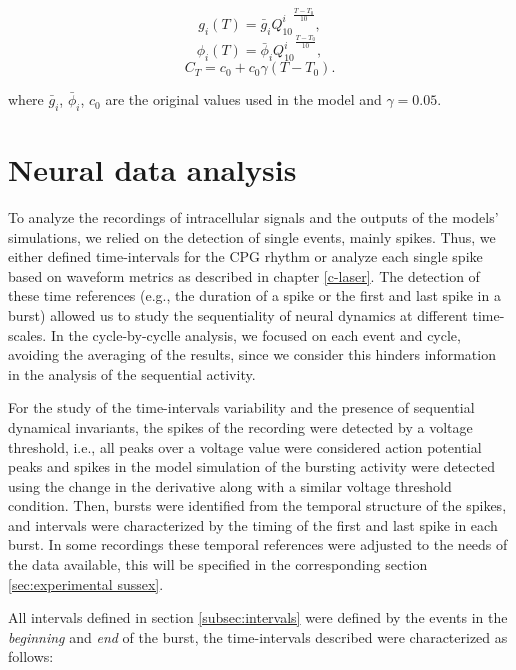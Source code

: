 \begin{equation}g_i(T)=\bar{g}_i{Q^i_{10}}^{\frac{T-T_0}{10}},
\label{Q10_conductance}
\end{equation}
\begin{equation}\phi_i(T)=\bar{\phi}_i{Q^i_{10}}^{\frac{T-T_0}{10}},
\label{Q10_gates}\end{equation}
\begin{equation}C_T=c_0 + c_0 \gamma(T-T_0).\end{equation}


where $\bar{g}_i$, $\bar{\phi}_i$, $c_0$ are the original values used in the model and $\gamma = 0.05$.

 
\section{Neural data analysis}

To analyze the recordings of intracellular signals and the outputs of the models' simulations, we relied on the detection of single events, mainly spikes. Thus, we either defined time-intervals for the CPG rhythm or analyze each single spike based on waveform metrics as described in chapter \ref{c-laser}. The detection of these time references (e.g., the duration of a spike or the first and last spike in a burst) allowed us to study the sequentiality of neural dynamics at different time-scales. In the cycle-by-cyclle analysis, we focused on each event and cycle, avoiding the averaging of the results, since we consider this hinders information in the analysis of the sequential activity. 

For the study of the time-intervals variability and the presence of sequential dynamical invariants, the spikes of the recording were detected by a voltage threshold, i.e., all peaks over a voltage value were considered action potential peaks and spikes in the model simulation of the bursting activity were detected using the change in the derivative along with a similar voltage threshold condition. Then, bursts were identified from the temporal structure of the spikes, and intervals were characterized by the timing of the first and last spike in each burst. In some recordings these temporal references were adjusted to the needs of the data available, this will be specified in the corresponding section \ref{sec:experimental sussex}.

All intervals defined in section \ref{subsec:intervals} were defined by the events in the \textit{beginning} and \textit{end} of the burst, the time-intervals described were characterized as follows:

